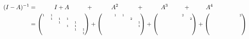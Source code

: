 \documentclass[popl.tex]{subfiles}
\begin{document}
\begin{align}
(I-A)^{-1} &= \hspace{1cm}I + A \hspace{1cm}+\hspace{1.05cm} A^2 \hspace{1.07cm}+\hspace{1cm} A^3 \hspace{0.9cm}+\hspace{0.9cm} A^4\\
  &=\begin{tiny}\begin{pmatrix}
      1 & 1 &   &   &   &   \\
        & 1 & 1 & 1 &   &   \\
        &   & 1 &   & 1 &   \\
        &   &   & 1 & 1 &   \\
        &   &   &   & 1 & 1 \\
        &   &   &   &   & 1  \\
  \end{pmatrix} + \begin{pmatrix}
        &   & 1 & 1 &   &   \\
        &   &   &   & 2 &   \\
        &   &   &   &   & 1 \\
        &   &   &   &   & 1 \\
        &   &   &   &   &   \\
        &   &   &   &   &   \\
  \end{pmatrix} + \begin{pmatrix}
        &   &   &   & 2 &   \\
        &   &   &   &   & 2 \\
        &   &   &   &   &   \\
        &   &   &   &   &   \\
        &   &   &   &   &   \\
        &   &   &   &   &   \\
  \end{pmatrix} + \begin{pmatrix}
        &   &   &   &   & 2 \\
        &   &   &   &   &   \\
        &   &   &   &   &   \\
        &   &   &   &   &   \\
        &   &   &   &   &   \\
        &   &   &   &   &   \\

\end{pmatrix}
\end{tiny}
\end{align}
\end{document}

